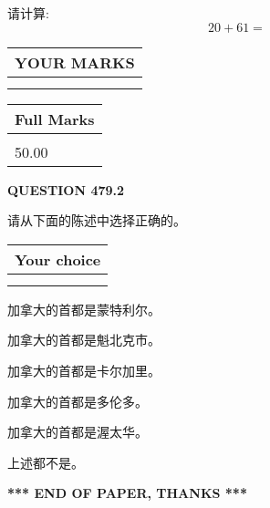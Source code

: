 \documentclass{ctexart}
\begin{document}
  
 
请计算:
\begin{equation}
20 +  %
61 = \nonumber
\end{equation}
 

 

 
  
\vspace{0.2in}
  
\noindent\begin{tabular}{|l|}
\hline
 YOUR MARKS  \\
\hline
 \\ 
 \\ 
\hline
\end{tabular}
\hspace{0.05in} \begin{tabular}{|l|}
\hline
 Full Marks  \\
\hline
 \\ 
50.00 \\
\hline
\end{tabular}
{\textbf{\Large{QUESTION
479.2 
}}}
  
  
请从下面的陈述中选择正确的。
  
  
\noindent\hspace{3.0in} \begin{tabular}{|l|}
\hline
Your choice \\
\hline
 \\ 
 \\ 
\hline
\end{tabular}
  
  
 
 
加拿大的首都是蒙特利尔。
 
 
加拿大的首都是魁北克市。
 
 
加拿大的首都是卡尔加里。
 
 
加拿大的首都是多伦多。
 
 
加拿大的首都是渥太华。
 
 
 上述都不是。
 
 
   
   
 \vspace{0.2in}
 
   
   
   
   
\vspace{1.0in} 
{\textbf{\large{ *** END OF PAPER, THANKS *** }}} 
   
\end{document}
